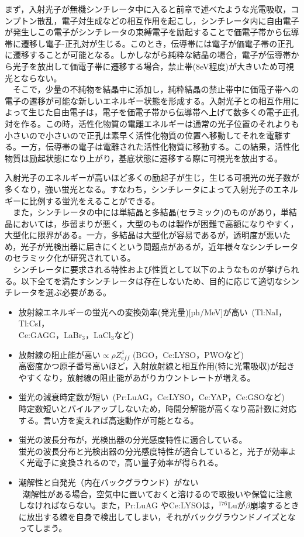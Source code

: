 まず，入射光子が無機シンチレータ中に入ると前章で述べたような光電吸収，コンプトン散乱，電子対生成などの相互作用を起こし，シンチレータ内に自由電子が発生しこの電子がシンチレータの束縛電子を励起することで価電子帯から伝導帯に遷移し電子-正孔対が生じる。このとき，伝導帯には電子が価電子帯の正孔に遷移することが可能となる。しかしながら純粋な結晶の場合，電子が伝導帯から光子を放出して価電子帯に遷移する場合，禁止帯(8eV程度)が大きいため可視光とならない。\\
\ \ そこで，少量の不純物を結晶中に添加し，純粋結晶の禁止帯中に価電子帯への電子の遷移が可能な新しいエネルギー状態を形成する。入射光子との相互作用によって生じた自由電子は，電子を価電子帯から伝導帯へ上げて数多くの電子正孔対を作る。この時，活性化物質の電離エネルギーは通常の光子位置のそれよりも小さいので小さいので正孔は素早く活性化物質の位置へ移動してそれを電離する。一方，伝導帯の電子は電離された活性化物質に移動する。この結果，活性化物質は励起状態になり上がり，基底状態に遷移する際に可視光を放出する。
\fi


入射光子のエネルギーが高いほど多くの励起子が生じ，生じる可視光の光子数が多くなり，強い蛍光となる。すなわち，シンチレータによって入射光子のエネルギーに比例する蛍光をえることができる。\\\ \ また，シンチレータの中には単結晶と多結晶(セラミック)のものがあり，単結晶においては，歩留まりが悪く，大型のものは製作が困難で高額になりやすく，大型化に限界がある。一方，多結晶は大型化が容易であるが，透明度が悪いため，光子が光検出器に届きにくという問題点があるが，近年様々なシンチレータのセラミック化が研究されている。\\\ \ シンチレータに要求される特性および性質として以下のようなものが挙げられる。以下全てを満たすシンチレータは存在しないため、目的に応じて適切なシンチレータを選ぶ必要がある。

\begin{itemize}
\item 放射線エネルギーの蛍光への変換効率(発光量)[ph/MeV]が高い\ (Tl:NaI，Tl:CsI，\\
Ce:GAGG，LaBr$_3$，LaCl$_3$など)\\
\item 放射線の阻止能が高い$\propto\rho Z^4_{eff}$ (BGO，Ce:LYSO，PWOなど) \\
高密度かつ原子番号高いほど，入射放射線と相互作用(特に光電吸収)が起きやすくなり，放射線の阻止能があがりカウントレートが増える。
\item 蛍光の減衰時定数が短い\ (Pr:LuAG，Ce:LYSO，Ce:YAP，Ce:GSOなど)\\
時定数短いとパイルアップしないため，時間分解能が高くなり高計数に対応する。言い方を変えれば高速動作が可能となる。
\item 蛍光の波長分布が，光検出器の分光感度特性に適合している。\\
蛍光の波長分布と光検出器の分光感度特性が適合していると，光子が効率よく光電子に変換されるので，高い量子効率が得られる。
\item 潮解性と自発光（内在バックグラウンド）がない\\\
潮解性がある場合，空気中に置いておくと溶けるので取扱いや保管に注意しなければならない。また，Pr:LuAG
やCe:LYSOは，$^{176}$Luが$\beta$崩壊するときに放出する線を自身で検出してしまい，それがバックグラウンドノイズとなってしまう。
\end{itemize}

